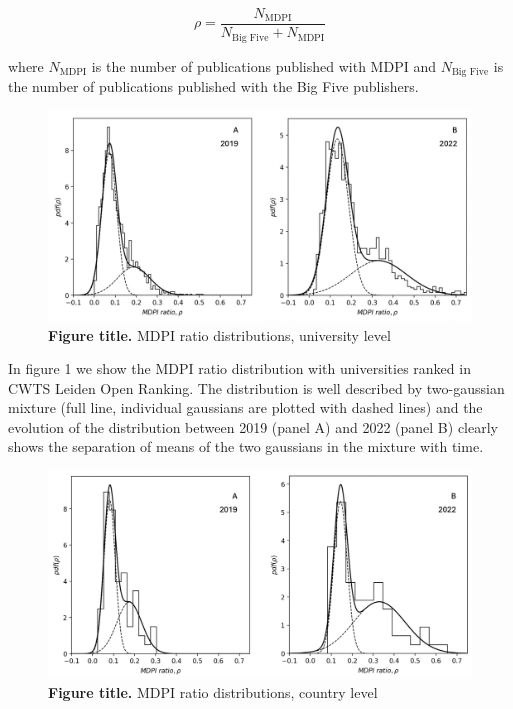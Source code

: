 \documentclass[amsfonts, amssymb, prl, superscriptaddress, notitlepage, twocolumn, nofootinbib]{revtex4-2}
\begin{document}
\begin{equation}
\rho = \frac{N_{\text{MDPI}}}{N_{\text{Big Five}}+N_{\text{MDPI}}}
\end{equation}

where $N_{\text{MDPI}}$ is the number of publications published with MDPI and $N_{\text{Big Five}}$ is the number of publications published with the Big Five publishers.

\begin{figure}
\centering
\includegraphics[width=1.0\linewidth]{Fig01.png}
\caption{\label{fig:fig1} {\bf Figure title.} MDPI ratio distributions, university level  
}
\end{figure}

In figure 1 we show the MDPI ratio distribution with universities ranked in CWTS Leiden Open Ranking. The distribution is well described by two-gaussian mixture (full line, individual gaussians  are plotted with dashed lines) and the evolution of the distribution between 2019 (panel A) and 2022 (panel B) clearly shows the separation of means of the two gaussians in the mixture with time.  

\begin{figure}
    \centering
    \includegraphics[width=1.0\linewidth]{Fig02.png}
    \caption{\label{fig:fig2} {\bf Figure title.} MDPI ratio distributions, country level  
    }
\end{figure}
\end{document}
